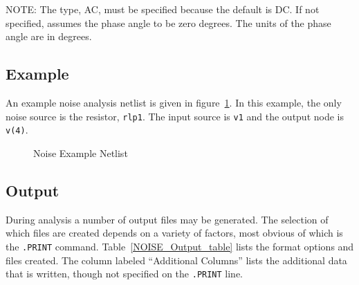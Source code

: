 
NOTE:	The type, AC, must be specified because the default is DC. If not specified, \Xyce{} assumes the
phase angle to be zero degrees.  The units of the phase angle are in degrees.

\subsection{Example}

An example noise analysis netlist is given in figure~\ref{noiseExample}.  In this example, 
the only noise source is the resistor, \texttt{rlp1}.  The input source is \texttt{v1} and
the output node is \texttt{v(4)}.
\begin{figure}[htbp]
  \begin{centering}
\caption[Noise Example Netlist]
{Noise Example Netlist \label{noiseExample} }
\end{centering}
\end{figure}

\subsection{Output}
\label{NOISE_Output}

During analysis a number of output files may be generated.  The
selection of which files are created depends on a variety of factors,
most obvious of which is the \texttt{.PRINT} command.
Table~\ref{NOISE_Output_table} lists the format options and files created.
The column labeled ``Additional Columns'' lists the additional data that
is written, though not specified on the \texttt{.PRINT} line.

